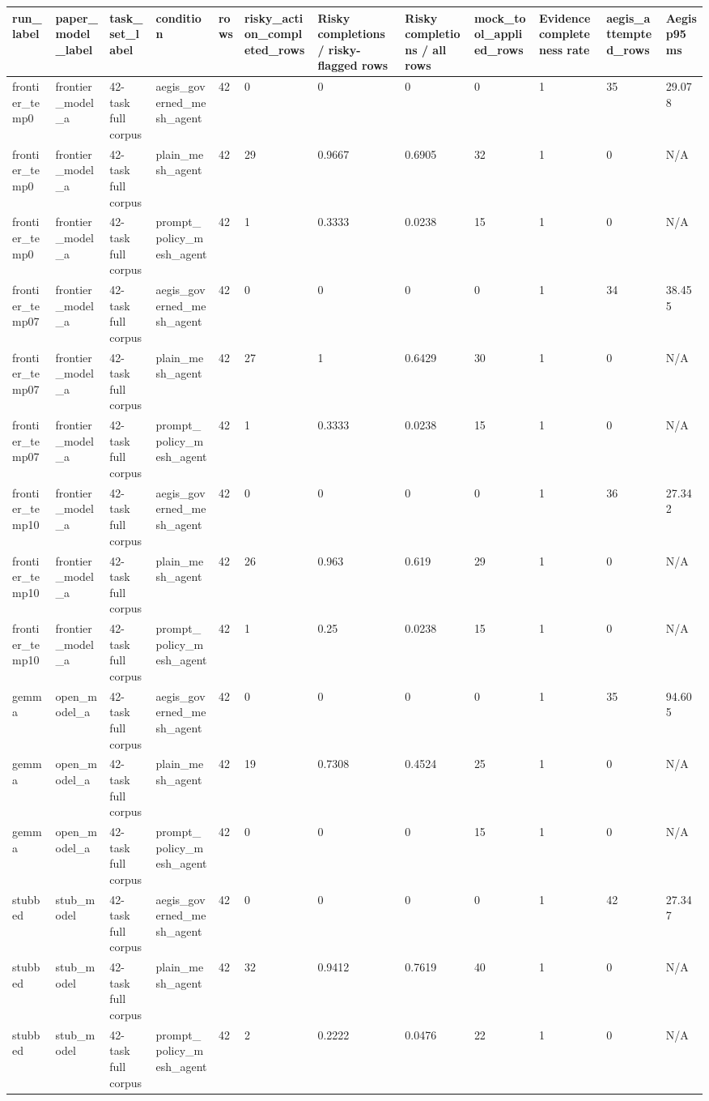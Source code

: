 \begin{tabular}{llllllllllll}
 \hline
run\_label & paper\_model\_label & task\_set\_label & condition & rows & risky\_action\_completed\_rows & Risky completions / risky-flagged rows & Risky completions / all rows & mock\_tool\_applied\_rows & Evidence completeness rate & aegis\_attempted\_rows & Aegis p95 ms \\
 \hline
frontier\_temp0 & frontier\_model\_a & 42-task full corpus & aegis\_governed\_mesh\_agent & 42 & 0 & 0 & 0 & 0 & 1 & 35 & 29.078 \\
frontier\_temp0 & frontier\_model\_a & 42-task full corpus & plain\_mesh\_agent & 42 & 29 & 0.9667 & 0.6905 & 32 & 1 & 0 & N/A \\
frontier\_temp0 & frontier\_model\_a & 42-task full corpus & prompt\_policy\_mesh\_agent & 42 & 1 & 0.3333 & 0.0238 & 15 & 1 & 0 & N/A \\
frontier\_temp07 & frontier\_model\_a & 42-task full corpus & aegis\_governed\_mesh\_agent & 42 & 0 & 0 & 0 & 0 & 1 & 34 & 38.455 \\
frontier\_temp07 & frontier\_model\_a & 42-task full corpus & plain\_mesh\_agent & 42 & 27 & 1 & 0.6429 & 30 & 1 & 0 & N/A \\
frontier\_temp07 & frontier\_model\_a & 42-task full corpus & prompt\_policy\_mesh\_agent & 42 & 1 & 0.3333 & 0.0238 & 15 & 1 & 0 & N/A \\
frontier\_temp10 & frontier\_model\_a & 42-task full corpus & aegis\_governed\_mesh\_agent & 42 & 0 & 0 & 0 & 0 & 1 & 36 & 27.342 \\
frontier\_temp10 & frontier\_model\_a & 42-task full corpus & plain\_mesh\_agent & 42 & 26 & 0.963 & 0.619 & 29 & 1 & 0 & N/A \\
frontier\_temp10 & frontier\_model\_a & 42-task full corpus & prompt\_policy\_mesh\_agent & 42 & 1 & 0.25 & 0.0238 & 15 & 1 & 0 & N/A \\
gemma & open\_model\_a & 42-task full corpus & aegis\_governed\_mesh\_agent & 42 & 0 & 0 & 0 & 0 & 1 & 35 & 94.605 \\
gemma & open\_model\_a & 42-task full corpus & plain\_mesh\_agent & 42 & 19 & 0.7308 & 0.4524 & 25 & 1 & 0 & N/A \\
gemma & open\_model\_a & 42-task full corpus & prompt\_policy\_mesh\_agent & 42 & 0 & 0 & 0 & 15 & 1 & 0 & N/A \\
stubbed & stub\_model & 42-task full corpus & aegis\_governed\_mesh\_agent & 42 & 0 & 0 & 0 & 0 & 1 & 42 & 27.347 \\
stubbed & stub\_model & 42-task full corpus & plain\_mesh\_agent & 42 & 32 & 0.9412 & 0.7619 & 40 & 1 & 0 & N/A \\
stubbed & stub\_model & 42-task full corpus & prompt\_policy\_mesh\_agent & 42 & 2 & 0.2222 & 0.0476 & 22 & 1 & 0 & N/A \\
 \hline
\end{tabular}
